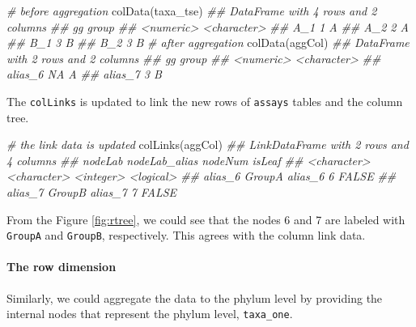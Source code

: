 \documentclass[]{article}
\newcommand{\hlcom}[1]{\textcolor[rgb]{0.502,0.502,0.502}{\textit{#1}}}%
\newcommand{\hlstd}[1]{\textcolor[rgb]{0.251,0.251,0.251}{#1}}%
\newcommand{\hlkwd}[1]{\textcolor[rgb]{0.878,0.439,0.125}{#1}}%
\newenvironment{Shaded}{\begin{myshaded}}{\end{myshaded}}
\newcommand{\KeywordTok}[1]{\hlkwd{#1}}
\newcommand{\CommentTok}[1]{\hlcom{#1}}
\newcommand{\NormalTok}[1]{\hlstd{#1}}
\begin{document}
\begin{Shaded}
\begin{Highlighting}[]
\CommentTok{# before aggregation}
\KeywordTok{colData}\NormalTok{(taxa_tse)}
\CommentTok{## DataFrame with 4 rows and 2 columns}
\CommentTok{##            gg       group}
\CommentTok{##     <numeric> <character>}
\CommentTok{## A_1         1           A}
\CommentTok{## A_2         2           A}
\CommentTok{## B_1         3           B}
\CommentTok{## B_2         3           B}
\CommentTok{# after aggregation}
\KeywordTok{colData}\NormalTok{(aggCol)}
\CommentTok{## DataFrame with 2 rows and 2 columns}
\CommentTok{##                gg       group}
\CommentTok{##         <numeric> <character>}
\CommentTok{## alias_6        NA           A}
\CommentTok{## alias_7         3           B}
\end{Highlighting}
\end{Shaded}

The \texttt{colLinks} is updated to link the new rows of \texttt{assays} tables and the column
tree.

\begin{Shaded}
\begin{Highlighting}[]
\CommentTok{# the link data is updated}
\KeywordTok{colLinks}\NormalTok{(aggCol)}
\CommentTok{## LinkDataFrame with 2 rows and 4 columns}
\CommentTok{##             nodeLab nodeLab_alias   nodeNum    isLeaf}
\CommentTok{##         <character>   <character> <integer> <logical>}
\CommentTok{## alias_6      GroupA       alias_6         6     FALSE}
\CommentTok{## alias_7      GroupB       alias_7         7     FALSE}
\end{Highlighting}
\end{Shaded}

From the Figure \ref{fig:rtree}, we could see that the nodes 6 and 7 are
labeled with \texttt{GroupA} and \texttt{GroupB}, respectively. This agrees with the
column link data.

\hypertarget{aggRow}{%
\paragraph{The row dimension}\label{aggRow}}

Similarly, we could aggregate the data to the phylum level by providing the internal nodes that represent the phylum level, \texttt{taxa\_one}.
\end{document}
